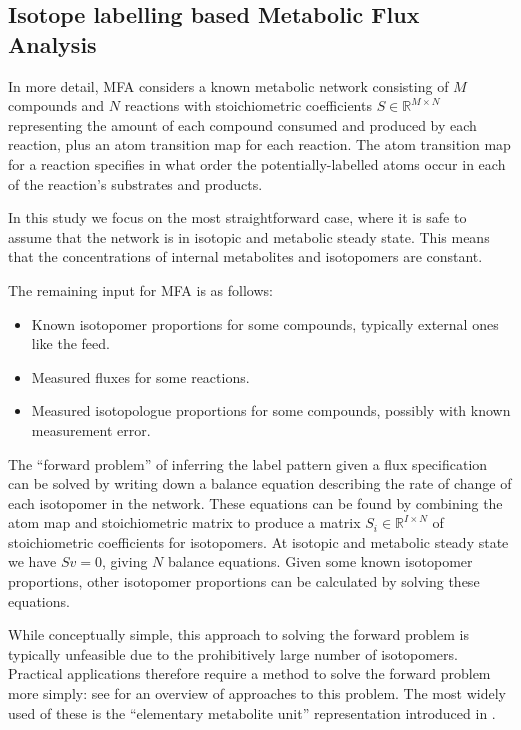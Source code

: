 \documentclass{article}
\begin{document}
\subsection{Isotope labelling based Metabolic Flux
Analysis}\label{isotope-labelling-based-metabolic-flux-analysis}

In more detail, MFA considers a known metabolic network consisting of
\(M\) compounds and \(N\) reactions with stoichiometric coefficients
\(S\in\mathbb{R}^{M\times N}\) representing the amount of each compound
consumed and produced by each reaction, plus an atom transition map for
each reaction. The atom transition map for a reaction specifies in what
order the potentially-labelled atoms occur in each of the reaction's
substrates and products.

In this study we focus on the most straightforward case, where it is
safe to assume that the network is in isotopic and metabolic steady
state. This means that the concentrations of internal metabolites and
isotopomers are constant.

The remaining input for MFA is as follows:

\begin{itemize}
\item
  Known isotopomer proportions for some compounds, typically external
  ones like the feed.
\item
  Measured fluxes for some reactions.
\item
  Measured isotopologue proportions for some compounds, possibly with
  known measurement error.
\end{itemize}

The ``forward problem'' of inferring the label pattern given a flux
specification can be solved by writing down a balance equation
describing the rate of change of each isotopomer in the network. These
equations can be found by combining the atom map and stoichiometric
matrix to produce a matrix \(S_i\in\mathbb{R}^{I\times N}\) of
stoichiometric coefficients for isotopomers. At isotopic and metabolic
steady state we have \(Sv=0\), giving \(N\) balance equations. Given
some known isotopomer proportions, other isotopomer proportions can be
calculated by solving these equations.

While conceptually simple, this approach to solving the forward problem
is typically unfeasible due to the prohibitively large number of
isotopomers. Practical applications therefore require a method to solve
the forward problem more simply: see
\citep[§3.1]{daiUnderstandingMetabolismFlux2017} for an overview of
approaches to this problem. The most widely used of these is the
``elementary metabolite unit'' representation introduced in
\citep{antoniewiczElementaryMetaboliteUnits2007}.
\end{document}
